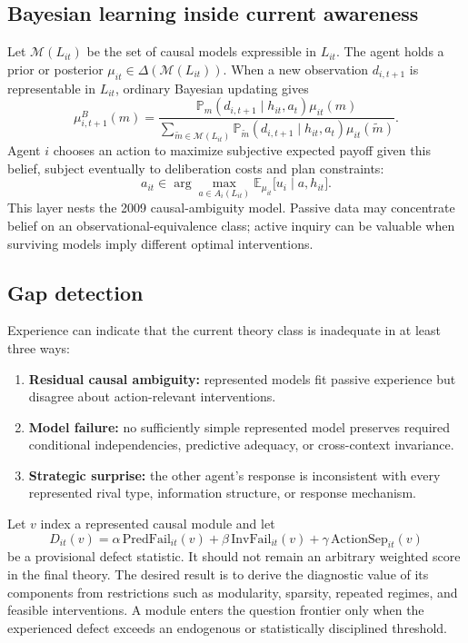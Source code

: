 \documentclass[11pt]{article}
\newcommand{\M}{\mathcal{M}}
\newcommand{\E}{\mathbb{E}}
\newcommand{\Prb}{\mathbb{P}}
\begin{document}
	\subsection{Bayesian learning inside current awareness}
	
	Let $\M(L_{it})$ be the set of causal models expressible in $L_{it}$.  The agent holds a prior or posterior $\mu_{it}\in\Delta(\M(L_{it}))$.  When a new observation $d_{i,t+1}$ is representable in $L_{it}$, ordinary Bayesian updating gives
	\begin{equation}
		\mu_{i,t+1}^{B}(m)
		=
		\frac{\Prb_m(d_{i,t+1}\mid h_{it},a_t)\mu_{it}(m)}
		{\sum_{\widetilde m\in\M(L_{it})}
			\Prb_{\widetilde m}(d_{i,t+1}\mid h_{it},a_t)\mu_{it}(\widetilde m)}.
	\end{equation}
	Agent $i$ chooses an action to maximize subjective expected payoff given this belief, subject eventually to deliberation costs and plan constraints:
	\begin{equation}
		a_{it}\in\arg\max_{a\in A_i(L_{it})}
		\E_{\mu_{it}}\bigl[u_i\mid a,h_{it}\bigr].
	\end{equation}
	This layer nests the 2009 causal-ambiguity model.  Passive data may concentrate belief on an observational-equivalence class; active inquiry can be valuable when surviving models imply different optimal interventions.
	
	\subsection{Gap detection}
	
	Experience can indicate that the current theory class is inadequate in at least three ways:
	\begin{enumerate}
		\item \textbf{Residual causal ambiguity:} represented models fit passive experience but disagree about action-relevant interventions.
		\item \textbf{Model failure:} no sufficiently simple represented model preserves required conditional independencies, predictive adequacy, or cross-context invariance.
		\item \textbf{Strategic surprise:} the other agent's response is inconsistent with every represented rival type, information structure, or response mechanism.
	\end{enumerate}
	
	Let $v$ index a represented causal module and let
	\begin{equation}
		D_{it}(v)
		=
		\alpha\,\mathrm{PredFail}_{it}(v)
		+\beta\,\mathrm{InvFail}_{it}(v)
		+\gamma\,\mathrm{ActionSep}_{it}(v)
	\end{equation}
	be a provisional defect statistic.  It should not remain an arbitrary weighted score in the final theory.  The desired result is to derive the diagnostic value of its components from restrictions such as modularity, sparsity, repeated regimes, and feasible interventions.  A module enters the question frontier only when the experienced defect exceeds an endogenous or statistically disciplined threshold.
	
\end{document}

